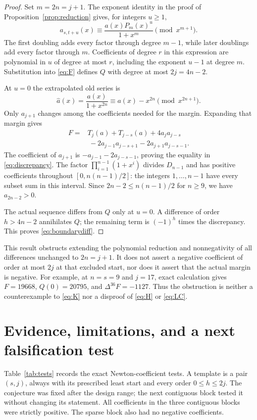 \documentclass[11pt]{article}
\begin{document}
\begin{proof}
Set $m=2n=j+1$. The exponent identity in the proof of
Proposition~\ref{prop:reduction} gives, for integers $u\geq1$,
\[
 a_{s,t+u}(x)\equiv\frac{a(x)P_m(x)^u}{1+x^m}
                         \pmod{x^{m+1}}.
\]
The first doubling adds every factor through degree $m-1$, while later
doublings add every factor through $m$. Coefficients of degree $r$ in
this expression are polynomial in $u$ of degree at most $r$, including
the exponent $u-1$ at degree $m$. Substitution into \eqref{eq:F} defines
$Q$ with degree at most $2j=4n-2$.

At $u=0$ the extrapolated old series is
\[
 \widehat a(x)=\frac{a(x)}{1+x^{2n}}
              \equiv a(x)-x^{2n}\pmod{x^{2n+1}}.
\]
Only $a_{j+1}$ changes among the coefficients needed for the margin.
Expanding that margin gives
\begin{align*}
 F={}&T_j(a)+T_{j-s}(a)+4a_ja_{j-s}\\
     &\ -2a_{j-1}a_{j-s+1}-2a_{j+1}a_{j-s-1}.
\end{align*}
The coefficient of $a_{j+1}$ is $-a_{j-1}-2a_{j-s-1}$, proving the
equality in \eqref{eq:discrepancy}. The factor
$\prod_{i=1}^{n-1}(1+x^i)$ divides $D_{n-1}$ and has positive
coefficients throughout $[0,n(n-1)/2]$: the integers $1,\ldots,n-1$
have every subset sum in this interval. Since $2n-2\leq n(n-1)/2$
for $n\geq9$, we have $a_{2n-2}>0$.

The actual sequence differs from $Q$ only at $u=0$. A difference of
order $h>4n-2$ annihilates $Q$; the remaining term is $(-1)^h$ times
the discrepancy. This proves \eqref{eq:boundarydiff}.
\end{proof}

This result obstructs extending the polynomial reduction and
nonnegativity of all differences unchanged to $2n=j+1$. It does not
assert a negative coefficient of order at most $2j$ at that excluded
start, nor does it assert that the actual margin is negative. For
example, at $n=s=9$ and $j=17$, exact calculation gives
$F=19668$, $Q(0)=20795$, and $\Delta^{36}F=-1127$.
Thus the obstruction is neither a counterexample to \eqref{eq:K} nor a
disproof of \eqref{eq:H} or \eqref{eq:LC}.

\section{Evidence, limitations, and a next falsification test}

Table~\ref{tab:tests} records the exact Newton-coefficient tests. A
template is a pair $(s,j)$, always with its prescribed least start and
every order $0\leq h\leq2j$. The conjecture was fixed after the design
range; the next contiguous block tested it without changing its statement.
All coefficients in the three contiguous blocks were strictly positive.
The sparse block also had no negative coefficients.
\end{document}
